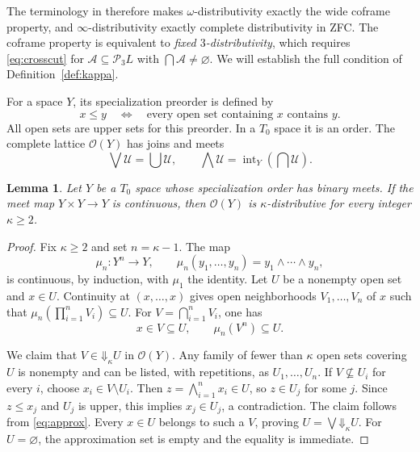 \documentclass[11pt]{amsart}
\newtheorem{lemma}[theorem]{Lemma}
\theoremstyle{definition}
\theoremstyle{remark}
\numberwithin{equation}{section}
\newcommand{\OO}{\mathcal O}
\newcommand{\PP}{\mathcal P}
\newcommand{\DD}{\mathord\Downarrow}
\newcommand{\intr}{\operatorname{int}}
\begin{document}
The terminology in \cite[Sections~1 and~6]{Erne2009} therefore makes
$\omega$-distributivity exactly the wide coframe property, and
$\infty$-distributivity exactly complete distributivity in ZFC.
The coframe property is equivalent to \emph{fixed $3$-distributivity},
which requires \eqref{eq:crosscut} for
$\mathcal A\subseteq\PP_3L$ with $\bigcap\mathcal A\ne\varnothing$.
We will establish the full condition of Definition~\ref{def:kappa}.

For a space $Y$, its specialization preorder is defined by
\[
x\leq y\quad\Longleftrightarrow\quad
\text{every open set containing $x$ contains $y$}.
\]
All open sets are upper sets for this preorder. In a $T_0$ space it is
an order. The complete lattice $\OO(Y)$ has joins and meets
\begin{equation}\label{eq:opens}
\bigvee\mathcal U=\bigcup\mathcal U,
\qquad
\bigwedge\mathcal U=\intr_Y\left(\bigcap\mathcal U\right).
\end{equation}

\begin{lemma}\label{lem:finite}
Let $Y$ be a $T_0$ space whose specialization order has binary meets.
If the meet map $Y\times Y\longrightarrow Y$ is continuous, then
$\OO(Y)$ is $\kappa$-distributive for every integer $\kappa\geq 2$.
\end{lemma}

\begin{proof}
Fix $\kappa\geq 2$ and set $n=\kappa-1$. The map
\[
\mu_n:Y^n\longrightarrow Y,
\qquad \mu_n(y_1,\ldots,y_n)=y_1\wedge\cdots\wedge y_n,
\]
is continuous, by induction, with $\mu_1$ the identity.
Let $U$ be a nonempty open set and $x\in U$. Continuity at
$(x,\ldots,x)$ gives open neighborhoods $V_1,\ldots,V_n$ of $x$
such that $\mu_n(\prod_{i=1}^n V_i)\subseteq U$.
For $V=\bigcap_{i=1}^n V_i$, one has
\begin{equation}\label{eq:finite-local}
x\in V\subseteq U,\qquad \mu_n(V^n)\subseteq U.
\end{equation}

We claim that $V\in\DD_\kappa U$ in $\OO(Y)$.
Any family of fewer than $\kappa$ open sets covering $U$ is nonempty
and can be listed, with repetitions, as $U_1,\ldots,U_n$.
If $V\nsubseteq U_i$ for every $i$, choose $x_i\in V\setminus U_i$.
Then $z=\bigwedge_{i=1}^n x_i\in U$, so $z\in U_j$ for some $j$.
Since $z\leq x_j$ and $U_j$ is upper, this implies $x_j\in U_j$,
a contradiction. The claim follows from \eqref{eq:approx}.
Every $x\in U$ belongs to such a $V$, proving
$U=\bigvee\DD_\kappa U$. For $U=\varnothing$, the approximation
set is empty and the equality is immediate.
\end{proof}
\end{document}
